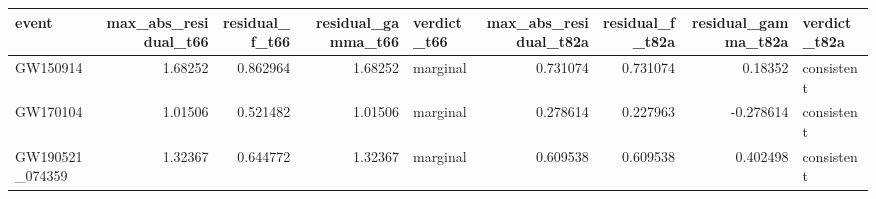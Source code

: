 \begin{tabular}{lrrrlrrrl}
\toprule
event & max\_abs\_residual\_t66 & residual\_f\_t66 & residual\_gamma\_t66 & verdict\_t66 & max\_abs\_residual\_t82a & residual\_f\_t82a & residual\_gamma\_t82a & verdict\_t82a \\
\midrule
GW150914 & 1.68252 & 0.862964 & 1.68252 & marginal & 0.731074 & 0.731074 & 0.18352 & consistent \\
GW170104 & 1.01506 & 0.521482 & 1.01506 & marginal & 0.278614 & 0.227963 & -0.278614 & consistent \\
GW190521\_074359 & 1.32367 & 0.644772 & 1.32367 & marginal & 0.609538 & 0.609538 & 0.402498 & consistent \\
\bottomrule
\end{tabular}
